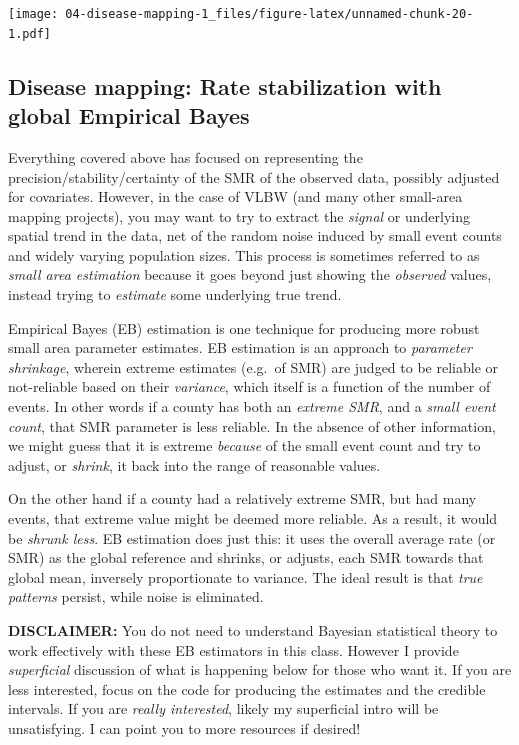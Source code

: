 \documentclass[
]{book}
\newenvironment{rmdcaution}[1]
  {
  \begin{itemize}
  \renewcommand{\labelitemi}{
    \raisebox{-.7\height}[0pt][0pt]{
      {\setkeys{Gin}{width=3em,keepaspectratio}\texttt{[image: images/\#1]}}
    }
  }
  \setlength{\fboxsep}{1em}
  \begin{caution}
  \item
  }
  {
  \end{caution}
  \end{itemize}
  }
\begin{document}
\texttt{[image: 04-disease-mapping-1\_files/figure-latex/unnamed-chunk-20-1.pdf]}

\hypertarget{disease-mapping-rate-stabilization-with-global-empirical-bayes}{%
\subsection{Disease mapping: Rate stabilization with global Empirical Bayes}\label{disease-mapping-rate-stabilization-with-global-empirical-bayes}}

Everything covered above has focused on representing the precision/stability/certainty of the SMR of the observed data, possibly adjusted for covariates. However, in the case of VLBW (and many other small-area mapping projects), you may want to try to extract the \emph{signal} or underlying spatial trend in the data, net of the random noise induced by small event counts and widely varying population sizes. This process is sometimes referred to as \emph{small area estimation} because it goes beyond just showing the \emph{observed} values, instead trying to \emph{estimate} some underlying true trend.

Empirical Bayes (EB) estimation is one technique for producing more robust small area parameter estimates. EB estimation is an approach to \emph{parameter shrinkage}, wherein extreme estimates (e.g.~of SMR) are judged to be reliable or not-reliable based on their \emph{variance}, which itself is a function of the number of events. In other words if a county has both an \emph{extreme SMR}, and a \emph{small event count}, that SMR parameter is less reliable. In the absence of other information, we might guess that it is extreme \emph{because} of the small event count and try to adjust, or \emph{shrink}, it back into the range of reasonable values.

On the other hand if a county had a relatively extreme SMR, but had many events, that extreme value might be deemed more reliable. As a result, it would be \emph{shrunk less}. EB estimation does just this: it uses the overall average rate (or SMR) as the global reference and shrinks, or adjusts, each SMR towards that global mean, inversely proportionate to variance. The ideal result is that \emph{true patterns} persist, while noise is eliminated.

\begin{rmdcaution}{caution}
\textbf{DISCLAIMER:} You do not need to understand Bayesian statistical theory to work effectively with these EB estimators in this class. However I provide \emph{superficial} discussion of what is happening below for those who want it. If you are less interested, focus on the code for producing the estimates and the credible intervals. If you are \emph{really interested}, likely my superficial intro will be unsatisfying. I can point you to more resources if desired!

\end{rmdcaution}
\end{document}
